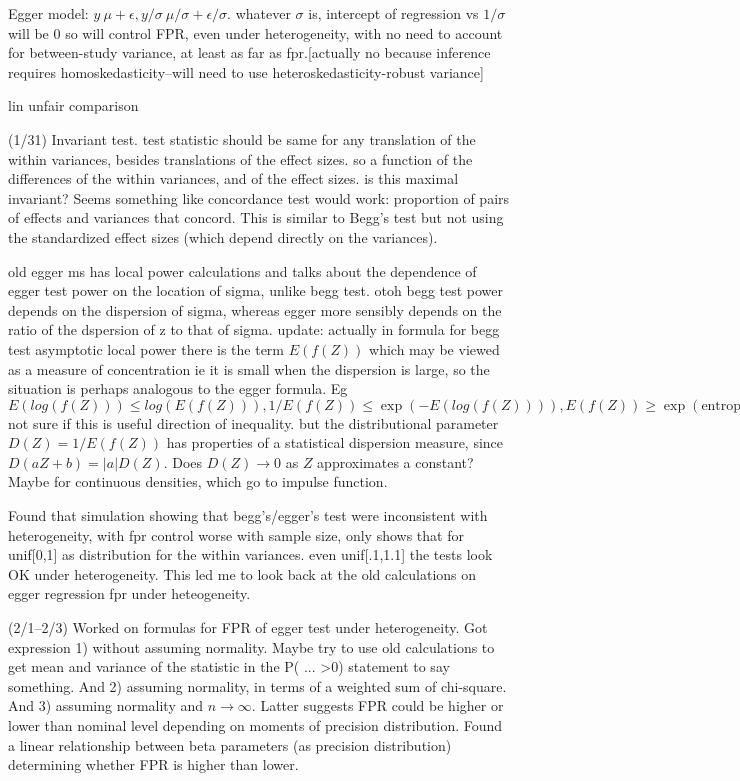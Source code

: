 \documentclass{article}
\begin{document}
Egger model: $y ~ \mu + \epsilon, y/\sigma ~ \mu/\sigma +
\epsilon/\sigma$. whatever $\sigma$ is, intercept of regression vs
$1/\sigma$ will be 0 so will control FPR, even under heterogeneity, with
no need to account for between-study variance, at least as far as
fpr.[actually no because inference requires homoskedasticity--will need to use heteroskedasticity-robust variance]


lin unfair comparison


(1/31) Invariant test. test statistic should be same for any translation of
the within variances, besides translations of the effect sizes. so a
function of the differences of the within variances, and of the effect
sizes. is this maximal invariant? Seems something like concordance
test would work: proportion of pairs of effects and variances that
concord. This is similar to Begg's test but not using the standardized
effect sizes (which depend directly on the variances).

old egger ms has local power calculations and talks about the
dependence of egger test power on the location of sigma, unlike begg
test. otoh begg test power depends on the dispersion of sigma, whereas
egger more sensibly depends on the ratio of the dspersion of z to that
of sigma. update: actually in formula for begg test asymptotic local
power there is the term $E(f(Z))$ which may be viewed as a measure of
concentration ie it is small when the dispersion is large, so the
situation is perhaps analogous to the egger formula. Eg
$E(log(f(Z))) \le log(E(f(Z))), 1/E(f(Z)) \le \exp(-E(log(f(Z)))),
E(f(Z)) \ge \exp(\text{entropy of }Z).$ not sure if this is useful
direction of inequality. but the distributional parameter
$D(Z)=1/E(f(Z))$ has properties of a statistical dispersion measure,
since $D(aZ+b)=|a|D(Z)$. Does $D(Z)\to 0$ as $Z$ approximates a
constant? Maybe for continuous densities, which go to impulse
function.

Found that simulation showing that begg's/egger's test were
inconsistent with heterogeneity, with fpr control worse with sample
size, only shows that for unif[0,1] as distribution for the within
variances. even unif[.1,1.1] the tests look OK under
heterogeneity. This led me to look back at the old calculations on
egger regression fpr under heteogeneity.


(2/1--2/3) Worked on formulas for FPR of egger test under
heterogeneity. Got expression 1) without assuming normality. Maybe try
to use old calculations to get mean and variance of the statistic in
the P( ... >0) statement to say something. And 2) assuming normality,
in terms of a weighted sum of chi-square. And 3) assuming normality
and $n\to\infty$. Latter suggests FPR could be higher or lower than
nominal level depending on moments of precision distribution. Found a
linear relationship between beta parameters (as precision
distribution) determining whether FPR is higher than lower.
\end{document}
